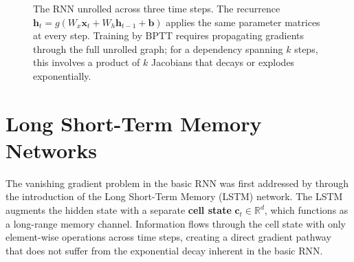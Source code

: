     \begin{figure}[htbp]
    \centering
    \caption{The RNN unrolled across three time steps. The recurrence
    $\mathbf{h}_t = g(W_x \mathbf{x}_t + W_h \mathbf{h}_{t-1} + \mathbf{b})$
    applies the same parameter matrices at every step. Training by BPTT requires
    propagating gradients through the full unrolled graph; for a dependency spanning
    $k$ steps, this involves a product of $k$ Jacobians that decays or explodes
    exponentially.}
    \label{fig:rnn_unrolled}
    \end{figure}

    \section*{Long Short-Term Memory Networks}

    The vanishing gradient problem in the basic RNN was first addressed by \citet{hochreiter1997long} through the introduction of the Long Short-Term Memory (LSTM) network. The LSTM augments the hidden state with a separate \textbf{cell state} $\mathbf{c}_t \in \mathbb{R}^d$, which functions as a long-range memory channel. Information flows through the cell state with only element-wise operations across time steps, creating a direct gradient pathway that does not suffer from the exponential decay inherent in the basic RNN. \\

